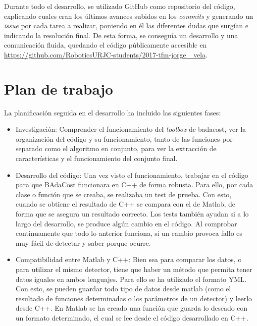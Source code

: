Durante todo el desarrollo, se utilizado GitHub como repositorio del código, explicando cuales eran los últimos avances subidos en los \textit{commits} y generando un \textit{issue} por cada tarea a realizar, poniendo en él las diferentes dudas que surgían e indicando la resolución final. De esta forma, se conseguía un desarrollo y una comunicación fluida, quedando el código públicamente accesible en \href{https://github.com/RoboticsURJC-students/2017-tfm-jorge_vela}{https://github.com/RoboticsURJC-students/2017-tfm-jorge_ vela}.



\section{Plan de trabajo}
La planificación seguida en el desarrollo ha incluido las siguientes fases:

\begin{itemize}
\item{Investigación: }Comprender el funcionamiento del \textit{toolbox} de badacost, ver la organización del código y su funcionamiento, tanto de las funciones por separado como el algoritmo en conjunto, para ver la extracción de características y el funcionamiento del conjunto final.

\item{Desarrollo del código: } Una vez visto el funcionamiento, trabajar en el código para que BAdaCost funcionara en C++ de forma robusta. Para ello, por cada clase o función que se creaba, se realizaba un test de prueba. Con esto, cuando se obtiene el resultado de C++ se compara con el de Matlab, de forma que se asegura un resultado correcto. Los tests también ayudan si a lo largo del desarrollo, se produce algún cambio en el código. Al comprobar continuamente que todo lo anterior funciona, si un cambio provoca fallo es muy fácil de detectar y saber porque ocurre.

\item{Compatibilidad entre Matlab y C++: } Bien sea para comparar los datos, o para utilizar el mismo detector, tiene que haber un método que permita tener datos iguales en ambos lenguajes. Para ello se ha utilizado el formato YML. Con esto, se pueden guardar todo tipo de datos desde matlab (como el resultado de funciones determinadas o los parámetros de un detector) y leerlo desde C++.
En Matlab se ha creado una función que guarda lo deseado con un formato determinado, el cual se lee desde el código desarrollado en C++.  

\end{itemize}






























